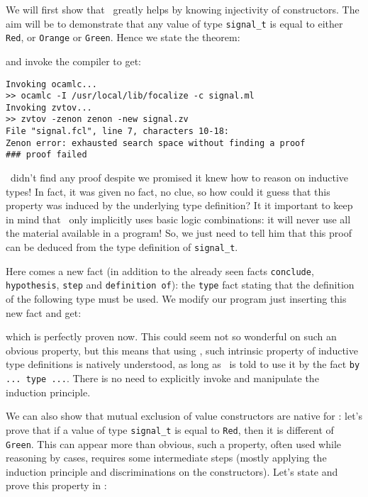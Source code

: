\documentclass[11pt,a4paper,twoside,onecolumn,fullpage]{article}
\begin{document}
\medskip
We will first show that \zenon\ greatly helps by knowing injectivity
of constructors. The aim will be to demonstrate that any value of type
\lstinline"signal_t" is equal to either \lstinline"Red", or \lstinline"Orange"
or \lstinline"Green". Hence we state the theorem:

{\scriptsize
}

\noindent and invoke the compiler to get:

{\scriptsize
\begin{verbatim}
Invoking ocamlc...
>> ocamlc -I /usr/local/lib/focalize -c signal.ml
Invoking zvtov...
>> zvtov -zenon zenon -new signal.zv
File "signal.fcl", line 7, characters 10-18:
Zenon error: exhausted search space without finding a proof
### proof failed
\end{verbatim}}

\zenon\ didn't find any proof despite we promised it knew how to
reason on inductive types! In fact, it was given no fact, no clue, so
how could it guess that this property was induced by the underlying
type definition? It it important to keep in mind that \zenon\ only implicitly uses
basic logic combinations: it will never use all the material
available in a program! So, we just need to tell him that this proof
can be deduced from the type definition of \lstinline"signal_t".

Here comes a new fact  (in addition to the already seen facts \lstinline"conclude",
\lstinline"hypothesis", \lstinline"step" and \lstinline"definition of"): the
\lstinline"type" fact stating that the definition of the following
type must be used. We modify our program just inserting this new fact
and get:

{\scriptsize
}

\noindent which is perfectly proven now. This could seem not so
wonderful on such an obvious property, but this means that using
\zenon, such intrinsic property of inductive type definitions is
natively understood, as long as \zenon\ is told to use it by the fact
\lstinline"by ... type ...". There is no need to explicitly invoke
and manipulate the induction principle.

\medskip
We can also show that mutual exclusion of value constructors are
native for \zenon: let's prove that if a value of type
\lstinline"signal_t" is equal to \lstinline"Red", then it is different
of \lstinline"Green". This can appear more than obvious, such a
property, often used while reasoning by cases, requires some
intermediate steps (mostly applying the induction principle and
discriminations on the constructors). Let's state and prove this
property in \focal:
\end{document}
